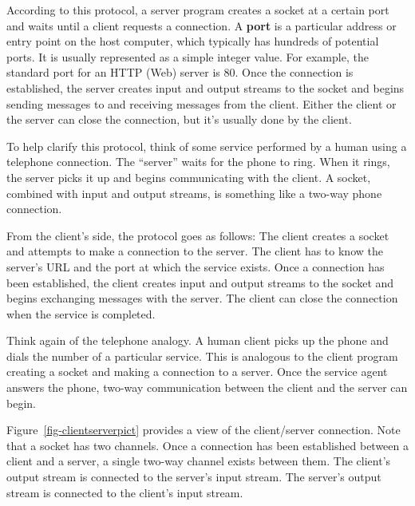 {According to this protocol, a server program creates a socket at a
certain port and waits until a client requests a connection.  A {\bf
port} is a particular address or entry point on the host
computer, which typically has hundreds of potential ports.  It is
usually represented as a simple integer value.  For example, the
standard port for an HTTP (Web) server is 80. Once the connection is
established, the server creates input and output streams to the socket
and begins sending messages to and receiving messages from the client.
Either the client or the server can close the connection, but it's
usually done by the client.


To help clarify this protocol, think of some service performed by a
human using a telephone connection.   The ``server'' waits for the
phone to ring.  When it rings, the server picks it up and begins
communicating with the client.  A socket, combined with input
and output streams, is something like a two-way phone connection.

From the client's side, the protocol goes as follows:  The client
creates a socket and attempts to make a connection to the server.  The
client has to know the server's URL and the port at which the service
exists.  Once a connection has been established, the client creates
input and output streams to the socket and begins exchanging messages
with the server.  The client can close the connection when the service
is completed.

Think again of the telephone analogy.  A human client picks up the
phone and dials the number of a particular service.  This is analogous
to the client program creating a socket and making a connection to a
server.  Once the service agent answers the phone, two-way
communication between the client and the server can begin.

Figure~\ref{fig-clientserverpict} provides a view of the client/server
connection.   Note that a socket has two channels.  Once a connection
has been established between a client and a server, a single two-way
channel exists between them.  The client's output stream is connected
to the server's input stream.  The server's output stream is connected
to the client's input stream.


}
